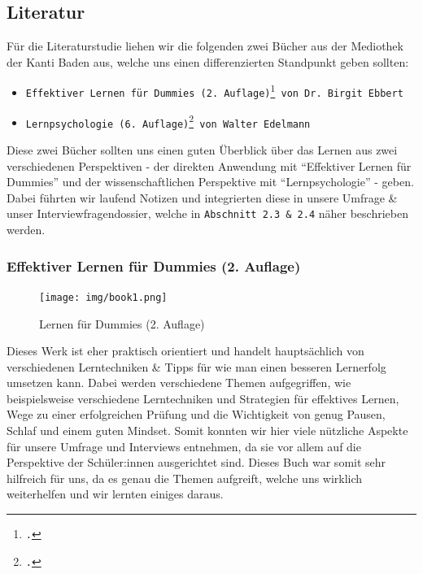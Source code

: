 \documentclass[12pt,a4paper]{report}
\begin{document}
\subsection{Literatur}
Für die Literaturstudie liehen wir die folgenden zwei Bücher aus der Mediothek der Kanti Baden aus, welche uns einen differenzierten Standpunkt geben sollten:
\begin{itemize}{}
    \item \texttt{Effektiver Lernen für Dummies (2. Auflage)\footcite{Book1} von Dr. Birgit Ebbert}
    \item \texttt{Lernpsychologie (6. Auflage)\footcite{Book2} von Walter Edelmann}
    
\end{itemize}
Diese zwei Bücher sollten uns einen guten Überblick über das Lernen aus zwei verschiedenen Perspektiven - der direkten Anwendung mit \enquote{Effektiver Lernen für Dummies} und der wissenschaftlichen Perspektive mit \enquote{Lernpsychologie} - geben. 
Dabei führten wir laufend Notizen und integrierten diese in unsere Umfrage \& unser Interviewfragendossier, welche in \texttt{Abschnitt 2.3 \& 2.4} näher beschrieben werden.

\subsubsection{Effektiver Lernen für Dummies (2. Auflage)}
\begin{figure}[H]
    \centering
    \texttt{[image: img/book1.png]}
    \caption[Lernen für Dummies (2. Auflage). Eigene Bildaufnahme.]{Lernen für Dummies (2. Auflage)}
\end{figure}

Dieses Werk ist eher praktisch orientiert und handelt hauptsächlich von verschiedenen Lerntechniken \& Tipps für wie man einen besseren Lernerfolg umsetzen kann. 
Dabei werden verschiedene Themen aufgegriffen, wie beispielsweise verschiedene Lerntechniken und Strategien für effektives Lernen, Wege zu einer erfolgreichen Prüfung und die Wichtigkeit von genug Pausen, Schlaf und einem guten Mindset.
Somit konnten wir hier viele nützliche Aspekte für unsere Umfrage und Interviews entnehmen, da sie vor allem auf die Perspektive der Schüler:innen ausgerichtet sind. 
Dieses Buch war somit sehr hilfreich für uns, da es genau die Themen aufgreift, welche uns wirklich weiterhelfen und wir lernten einiges daraus.
\end{document}
